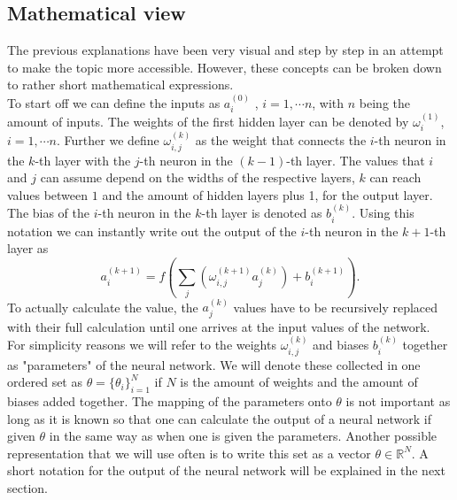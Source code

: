 \subsection{Mathematical view}
The previous explanations have been very visual and step by step in an attempt to make the topic more accessible. However, these concepts can be broken down to rather short mathematical expressions.\\
To start off we can define the inputs as $a_i^{(0)}$ , $i =  1, \dotsb n$, with $n$ being the amount of inputs. The weights of the first hidden layer can be denoted by $\omega_{i}^{(1)}$, $i =  1, \dotsb n$. Further we define $\omega_{i,j}^{(k)}$ as the weight that connects the $i$-th neuron in the $k$-th layer with the $j$-th neuron in the $(k-1)$-th layer. The values that $i$ and $j$ can assume depend on the widths of the respective layers, $k$ can reach values between $1$ and the amount of hidden layers plus 1, for the output layer. The bias of the $i$-th neuron in the $k$-th layer is denoted as $b_i^{(k)}$. Using this notation we can instantly write out the output of the $i$-th neuron in the $k+1$-th layer as
\begin{equation}
	a_i^{(k+1)} = f\left(\sum_j \left(\omega_{i,j}^{(k+1)}a_j^{(k)}\right) + b_i^{(k+1)}\right).
\end{equation}
To actually calculate the value, the $a_j^{(k)}$ values have to be recursively replaced with their full calculation until one arrives at the input values of the network.\\
For simplicity reasons we will refer to the weights $\omega_{i,j}^{(k)}$ and biases $b_i^{(k)}$ together as "parameters" of the neural network. We will denote these collected in one ordered set as $\theta = \{\theta_i\}_{i=1}^{N}$ if $N$ is the amount of weights and the amount of biases added together. The mapping of the parameters onto $\theta$ is not important as long as it is known so that one can calculate the output of a neural network if given $\theta$ in the same way as when one is given the parameters. Another possible representation that we will use often is to write this set as a vector $\theta \in \mathbb{R}^N$. A short notation for the output of the neural network will be explained in the next section.
